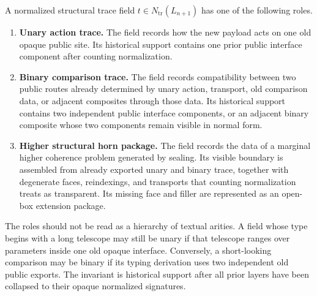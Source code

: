 \documentclass{lmcs}
\begin{document}
\begin{defi}
A normalized structural trace field \(t\in N_{\mathrm{tr}}(L_{n+1})\) has one of the following
roles.

\begin{enumerate}
\item \textbf{Unary action trace.}  The field records how the new payload acts on one old
opaque public site.  Its historical support contains one prior public interface component
after counting normalization.

\item \textbf{Binary comparison trace.}  The field records compatibility between two public
routes already determined by unary action, transport, old comparison data, or adjacent
composites through those data.  Its historical support contains two independent public
interface components, or an adjacent binary composite whose two components remain visible in
normal form.

\item \textbf{Higher structural horn package.}  The field records the data of a marginal
higher coherence problem generated by sealing.  Its visible boundary is assembled from
already exported unary and binary trace, together with degenerate faces, reindexings, and
transports that counting normalization treats as transparent.  Its missing face and filler are
represented as an open-box extension package.
\end{enumerate}
\end{defi}

The roles should not be read as a hierarchy of textual arities.  A field whose type begins
with a long telescope may still be unary if that telescope ranges over parameters inside one
old opaque interface.  Conversely, a short-looking comparison may be binary if its typing
derivation uses two independent old public exports.  The invariant is historical support after
all prior layers have been collapsed to their opaque normalized signatures.
\end{document}
